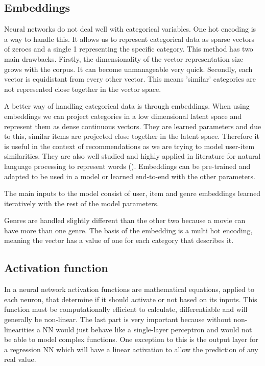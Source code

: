 
\subsection{Embeddings}
Neural networks do not deal well with categorical variables. One hot encoding is a way to handle this. It allows us to represent categorical data as sparse vectors of zeroes and a single 1 representing the specific category. This method has two main drawbacks. Firstly, the dimensionality of the vector representation size grows with the corpus. It can become unmanageable very quick. Secondly, each vector is equidistant from every other vector. This means 'similar' categories are not represented close together in the vector space.

A better way of handling categorical data is through embeddings. When using embeddings we can project categories in a low dimensional latent space and represent them as dense continuous vectors. They are learned parameters and due to this, similar items are projected close together in the latent space. Therefore it is useful in the context of recommendations as we are trying to model user-item similarities. They are also well studied and highly applied in literature for natural language processing to represent words (\citet{embeddings}). Embeddings can be pre-trained and adapted to be used in a model or learned end-to-end with the other parameters.

The main inputs to the model consist of user, item and genre embeddings learned iteratively with the rest of the model parameters.

Genres are handled slightly different than the other two because a movie can have more than one genre. The basis of the embedding is a multi hot encoding, meaning the vector has a value of one for each category that describes it.

\subsection{Activation function}
In a neural network activation functions are mathematical equations, applied to each neuron, that determine if it should activate or not based on its inputs. This function must be computationally efficient to calculate, differentiable and will generally be non-linear. The last part is very important because without non-linearities a NN would just behave like a single-layer perceptron and would not be able to model complex functions. One exception to this is the output layer for a regression NN which will have a linear activation to allow the prediction of any real value.

